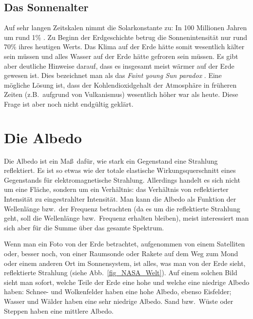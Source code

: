 \subsection{Das Sonnenalter}

Auf sehr langen Zeitskalen nimmt die Solarkonstante zu: In 100 Millionen Jahren um rund 1\% 
\cite{Wikipedia_Solarkonstante}. Zu Beginn der Erdgeschichte betrug die Sonnenintensit\"at nur
rund 70\% ihres heutigen Werts. Das Klima auf der Erde h\"atte somit wesentlich k\"alter sein m\"ussen
und alles Wasser auf der Erde h\"atte gefroren sein m\"ussen. Es gibt aber deutliche Hinweise
darauf, dass es insgesamt meist w\"armer auf der Erde gewesen ist. Dies bezeichnet man als
das  \textit{Faint young Sun paradox} \cite{Wikipedia_Faint}. Eine m\"ogliche L\"osung ist, dass der
Kohlendioxidgehalt der Atmosph\"are in fr\"uheren Zeiten (z.B.\ aufgrund von Vulkanismus)
wesentlich h\"oher war als heute. Diese Frage ist aber noch nicht endg\"ultig gekl\"art.

\section{Die Albedo}

Die Albedo ist ein Ma\ss\ daf\"ur, wie stark ein Gegenstand eine Strahlung reflektiert. Es ist so etwas
wie der totale elastische Wirkungsquerschnitt eines Gegenstands f\"ur elektromagnetische Strahlung. 
Allerdings handelt es sich nicht um eine Fl\"ache, sondern um ein Verh\"altnis: das Verh\"altnis
von reflektierter Intensit\"at zu eingestrahlter Intensit\"at. Man kann die Albedo als Funktion
der Wellenl\"ange bzw.\ der Frequenz betrachten (da es um die reflektierte Strahlung geht, soll die
Wellenl\"ange bzw.\ Frequenz erhalten bleiben), meist interessiert man sich aber f\"ur die
Summe \"uber das gesamte Spektrum. 

Wenn man ein Foto von der Erde betrachtet, aufgenommen von einem Satelliten oder, besser noch, 
von einer Raumsonde oder Rakete auf dem Weg zum Mond oder einem anderen Ort im Sonnensystem,   
ist alles, was man von der Erde sieht, reflektierte Strahlung (siehe Abb.\ \ref{fig_NASA_Welt}). 
Auf einem solchen Bild sieht man
sofort, welche Teile der Erde eine hohe und welche eine niedrige Albedo haben: Schnee- und Wolkenfelder
haben eine hohe Albedo, ebenso Eisfelder; Wasser und W\"alder haben eine sehr niedrige Albedo. 
Sand bzw.\ W\"uste oder Steppen haben eine mittlere Albedo. 

